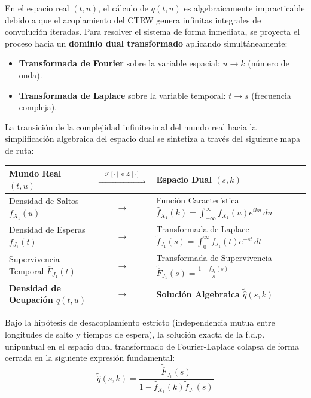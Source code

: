 \noindent 
En el espacio real $(t, u)$, el cálculo de $q(t, u)$ es algebraicamente impracticable debido a que el acoplamiento del CTRW genera infinitas integrales de convolución iteradas. Para resolver el sistema de forma inmediata, se proyecta el proceso hacia un \textbf{dominio dual transformado} aplicando simultáneamente:
\begin{itemize}
    \item \textbf{Transformada de Fourier} sobre la variable espacial: $u \longrightarrow k$ (número de onda).
    \item \textbf{Transformada de Laplace} sobre la variable temporal: $t \longrightarrow s$ (frecuencia compleja).
\end{itemize}


\begin{teo}
    La transición de la complejidad infinitesimal del mundo real hacia la simplificación algebraica del espacio dual se sintetiza a través del siguiente mapa de ruta:
    \begin{center}
    \renewcommand{\arraystretch}{1.5}
    \begin{tabular}{lcl}
    \textbf{Mundo Real} $(t, u)$ & $\xrightarrow{\quad\mathcal{F}[\cdot]\text{ e }\mathcal{L}[\cdot]\quad}$ & \textbf{Espacio Dual} $(s, k)$ \\
    \hline
    Densidad de Saltos $f_{X_1}(u)$ & $\longrightarrow$ & Función Característica $\hat{f}_{X_1}(k) = \int_{-\infty}^{\infty} f_{X_1}(u) e^{iku} \, du$ \\
    Densidad de Esperas $f_{J_1}(t)$ & $\longrightarrow$ & Transformada de Laplace $\widetilde{f}_{J_1}(s) = \int_{0}^{\infty} f_{J_1}(t) e^{-st} \, dt$ \\
    Supervivencia Temporal $\overline{F}_{J_1}(t)$ & $\longrightarrow$ & Transformada de Supervivencia $\widetilde{\overline{F}}_{J_1}(s) = \frac{1 - \widetilde{f}_{J_1}(s)}{s}$ \\
    \hline
    \textbf{Densidad de Ocupación $q(t, u)$} & $\longrightarrow$ & \textbf{Solución Algebraica $\widetilde{\hat{q}}(s, k)$} \\
    \end{tabular}
    \end{center}
\end{teo}

\begin{teo}
    Bajo la hipótesis de desacoplamiento estricto (independencia mutua entre longitudes de salto y tiempos de espera), la solución exacta de la f.d.p. unipuntual en el espacio dual transformado de Fourier-Laplace colapsa de forma cerrada en la siguiente expresión fundamental:
    \[
    \widetilde{\hat{q}}(s, k) = \frac{\widetilde{\overline{F}}_{J_1}(s)}{1 - \hat{f}_{X_1}(k) \widetilde{f}_{J_1}(s)}
    \]
\end{teo}

